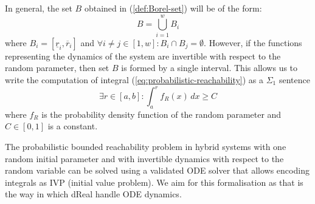 In general, the set $B$ obtained in (\ref{def:Borel-set}) will be of the form:
\begin{equation*} %
B = \bigcup_{i=1}^{w} B_{i}
\end{equation*}
where $B_{i} = [\underline{r}_{i}, \overline{r}_{i}]$ and 
$\forall i \ne j \in [1, w]:B_{i} \cap B_{j} = \emptyset$. However, if the functions representing the
dynamics of the system are invertible with respect to the random parameter, then set $B$ is formed 
by a single interval. This allows us to write the computation of integral 
(\ref{eq:probabilistic-reachability}) as a $\Sigma_1$ sentence 
\begin{equation*} %
\exists r \in [a, b]: \int_{a}^{r} f_R(x)\, dx \ge C
\end{equation*}
where $f_R$ is the probability density function of the random parameter and $C \in [0,1]$ is a
constant.

The probabilistic bounded reachability problem in hybrid systems with one random initial parameter 
and with invertible dynamics with respect to the random variable can be solved using a validated 
ODE solver that allows encoding integrals as IVP (initial value problem). We aim for this 
formalisation as that is the way in which dReal handle ODE dynamics.



